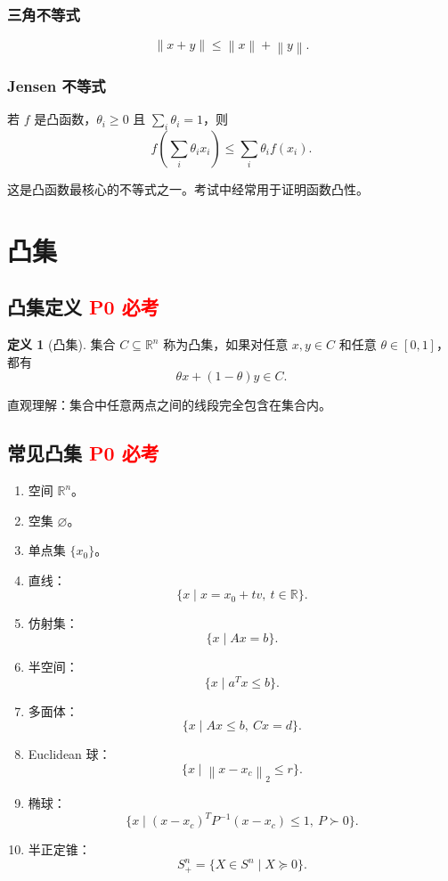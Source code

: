 \documentclass[11pt,a4paper]{ctexart}
\newcommand{\R}{\mathbb{R}}
\newcommand{\norm}[1]{\left\lVert #1 \right\rVert}
\newcommand{\Pzero}{\textcolor{red}{\textbf{P0 必考}}}
\theoremstyle{definition}
\newtheorem{definition}{定义}[section]
\theoremstyle{plain}
\theoremstyle{remark}
\begin{document}
\subsubsection*{三角不等式}

\[
    \norm{x+y} \le \norm{x}+\norm{y}.
\]

\subsubsection*{Jensen 不等式}

若 $f$ 是凸函数，$\theta_i \ge 0$ 且 $\sum_i \theta_i = 1$，则
\[
    f\left(\sum_i \theta_i x_i\right)
    \le
    \sum_i \theta_i f(x_i).
\]

这是凸函数最核心的不等式之一。考试中经常用于证明函数凸性。

\section{凸集}

\subsection{凸集定义 \Pzero}

\begin{definition}[凸集]
集合 $C \subseteq \R^n$ 称为凸集，如果对任意 $x,y \in C$ 和任意 $\theta \in [0,1]$，都有
\[
    \theta x + (1-\theta)y \in C.
\]
\end{definition}

直观理解：集合中任意两点之间的线段完全包含在集合内。

\subsection{常见凸集 \Pzero}

\begin{enumerate}
    \item 空间 $\R^n$。
    \item 空集 $\varnothing$。
    \item 单点集 $\{x_0\}$。
    \item 直线：
    \[
        \{x \mid x = x_0 + tv,\ t \in \R\}.
    \]
    \item 仿射集：
    \[
        \{x \mid Ax=b\}.
    \]
    \item 半空间：
    \[
        \{x \mid a^T x \le b\}.
    \]
    \item 多面体：
    \[
        \{x \mid Ax \le b,\ Cx=d\}.
    \]
    \item Euclidean 球：
    \[
        \{x \mid \norm{x-x_c}_2 \le r\}.
    \]
    \item 椭球：
    \[
        \{x \mid (x-x_c)^T P^{-1}(x-x_c) \le 1,\ P \succ 0\}.
    \]
    \item 半正定锥：
    \[
        S_+^n = \{X \in S^n \mid X \succeq 0\}.
    \]
\end{enumerate}
\end{document}
